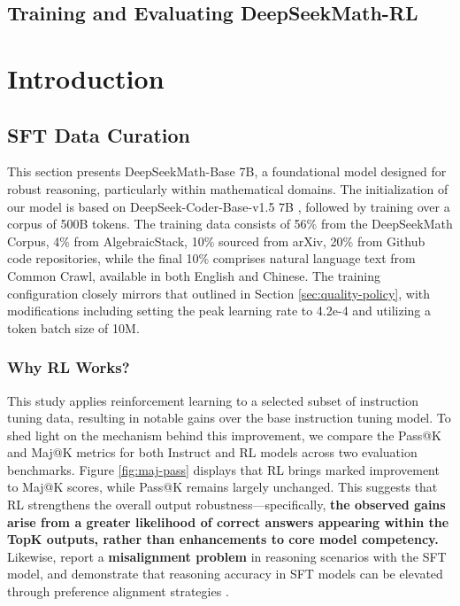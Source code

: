 \subsection{Training and Evaluating DeepSeekMath-RL}

\section{Introduction}

\subsection{SFT Data Curation}

This section presents DeepSeekMath-Base 7B, a foundational model designed for robust reasoning, particularly within mathematical domains. The initialization of our model is based on DeepSeek-Coder-Base-v1.5 7B \citep{deepseek-coder}, followed by training over a corpus of 500B tokens. The training data consists of 56\% from the DeepSeekMath Corpus, 4\% from AlgebraicStack, 10\% sourced from arXiv, 20\% from Github code repositories, while the final 10\% comprises natural language text from Common Crawl, available in both English and Chinese. The training configuration closely mirrors that outlined in Section \ref{sec:quality-policy}, with modifications including setting the peak learning rate to 4.2e-4 and utilizing a token batch size of 10M.

\subsubsection{Why RL Works?} This study applies reinforcement learning to a selected subset of instruction tuning data, resulting in notable gains over the base instruction tuning model. To shed light on the mechanism behind this improvement, we compare the Pass@K and Maj@K metrics for both Instruct and RL models across two evaluation benchmarks. Figure \ref{fig:maj-pass} displays that RL brings marked improvement to Maj@K scores, while Pass@K remains largely unchanged. This suggests that RL strengthens the overall output robustness—specifically, \textbf{the observed gains arise from a greater likelihood of correct answers appearing within the TopK outputs, rather than enhancements to core model competency.} Likewise, \citep{wang2023making} report a \textbf{misalignment problem} in reasoning scenarios with the SFT model, and demonstrate that reasoning accuracy in SFT models can be elevated through preference alignment strategies \citep{yuan2023rrhf,song2023preference,wang2023making}.

